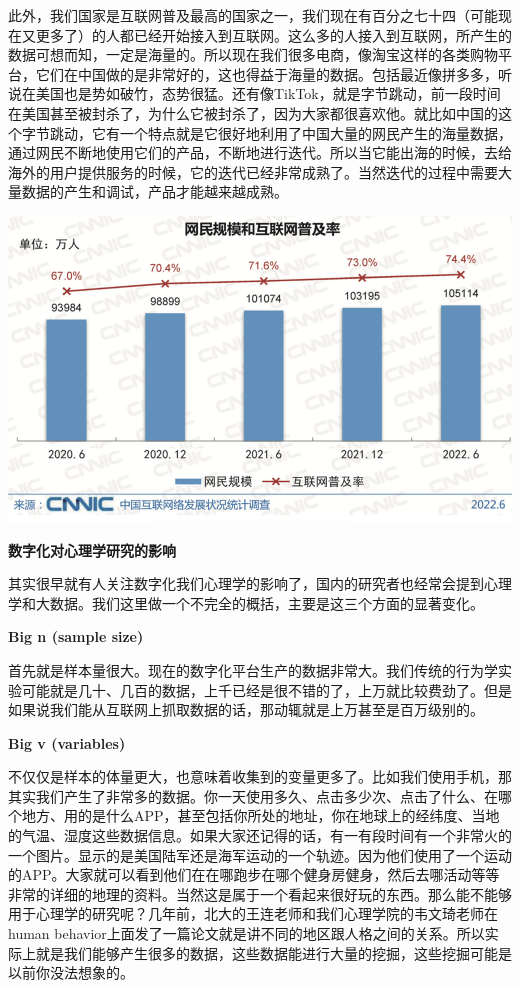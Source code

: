 \documentclass[
  oneside]{book}
\begin{document}
此外，我们国家是互联网普及最高的国家之一，我们现在有百分之七十四（可能现在又更多了）的人都已经开始接入到互联网。这么多的人接入到互联网，所产生的数据可想而知，一定是海量的。所以现在我们很多电商，像淘宝这样的各类购物平台，它们在中国做的是非常好的，这也得益于海量的数据。包括最近像拼多多，听说在美国也是势如破竹，态势很猛。还有像TikTok，就是字节跳动，前一段时间在美国甚至被封杀了，为什么它被封杀了，因为大家都很喜欢他。就比如中国的这个字节跳动，它有一个特点就是它很好地利用了中国大量的网民产生的海量数据，通过网民不断地使用它们的产品，不断地进行迭代。所以当它能出海的时候，去给海外的用户提供服务的时候，它的迭代已经非常成熟了。当然迭代的过程中需要大量数据的产生和调试，产品才能越来越成熟。

\includegraphics{1001-lesson1/image-20230302194931963.png}

\textbf{数字化对心理学研究的影响}

其实很早就有人关注数字化我们心理学的影响了，国内的研究者也经常会提到心理学和大数据。我们这里做一个不完全的概括，主要是这三个方面的显著变化。

\textbf{Big n (sample size)}

首先就是样本量很大。现在的数字化平台生产的数据非常大。我们传统的行为学实验可能就是几十、几百的数据，上千已经是很不错的了，上万就比较费劲了。但是如果说我们能从互联网上抓取数据的话，那动辄就是上万甚至是百万级别的。

\textbf{Big v (variables)}

不仅仅是样本的体量更大，也意味着收集到的变量更多了。比如我们使用手机，那其实我们产生了非常多的数据。你一天使用多久、点击多少次、点击了什么、在哪个地方、用的是什么APP，甚至包括你所处的地址，你在地球上的经纬度、当地的气温、湿度这些数据信息。如果大家还记得的话，有一有段时间有一个非常火的一个图片。显示的是美国陆军还是海军运动的一个轨迹。因为他们使用了一个运动的APP。大家就可以看到他们在在哪跑步在哪个健身房健身，然后去哪活动等等非常的详细的地理的资料。当然这是属于一个看起来很好玩的东西。那么能不能够用于心理学的研究呢？几年前，北大的王连老师和我们心理学院的韦文琦老师在human
behavior上面发了一篇论文就是讲不同的地区跟人格之间的关系。所以实际上就是我们能够产生很多的数据，这些数据能进行大量的挖掘，这些挖掘可能是以前你没法想象的。
\end{document}
